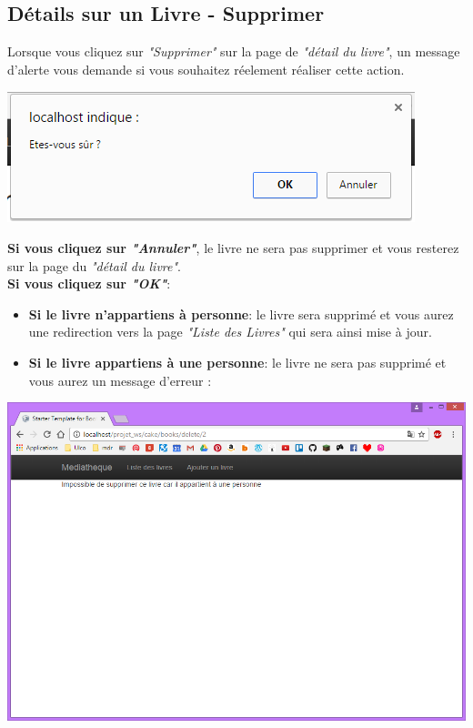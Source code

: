 \documentclass{report}
\begin{document}
			\subsection{D\'{e}tails sur un Livre - Supprimer}
			Lorsque vous cliquez sur \textit{"Supprimer"} sur la page de \textit{"d\'{e}tail du livre"}, un message d'alerte vous demande si vous souhaitez r\'{e}element r\'{e}aliser cette action.
			\begin{center}
				\includegraphics[scale=0.4]{img/manuel/DetailLivre_Supprimer.png}  
			\end{center}
			\textbf{Si vous cliquez sur \textit{"Annuler"}}, le livre ne sera pas supprimer et vous resterez sur la page du \textit{"d\'{e}tail du livre"}.\\
			\textbf{Si vous cliquez sur \textit{"OK"}}: 
			\begin{itemize}
			 \item \textbf{Si le livre n'appartiens \`{a} personne}: le livre sera supprim\'{e} et vous aurez une redirection vers la page \textit{"Liste des Livres"} qui sera ainsi mise \`{a} jour. 
			 \item \textbf{Si le livre appartiens \`{a} une personne}: le livre ne sera pas supprim\'{e} et vous aurez un message d'erreur : 
			\end{itemize} 
			
			\begin{center}
				\includegraphics[scale=0.4]{img/manuel/DetailLivre_Supprimer_error.png}  
			\end{center}
			
\end{document}
